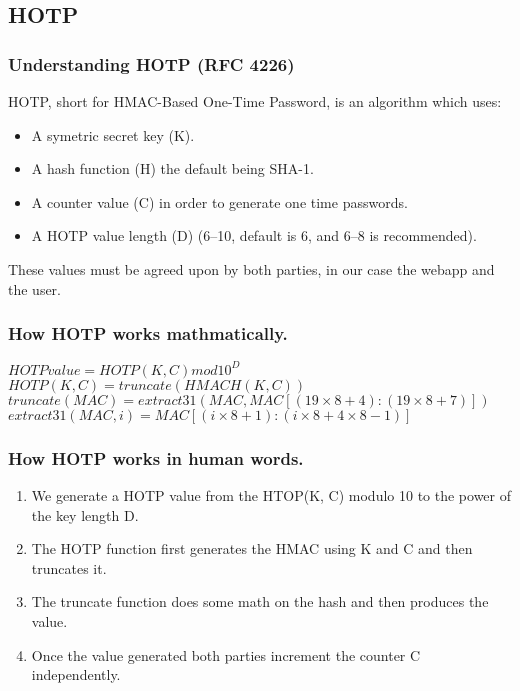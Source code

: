 \documentclass{beamer}
\begin{document}
\subsection{HOTP}
\begin{frame}

    \frametitle{Understanding HOTP (RFC 4226)}
    HOTP, short for HMAC-Based One-Time Password, is an algorithm which uses:
    \begin{itemize}
        \item 
            A symetric secret key (K).
        \item 
            A hash function (H) the default being SHA-1.
        \item 
            A counter value (C) in order to generate one time passwords.
        \item 
            A HOTP value length (D) (6–10, default is 6, and 6–8 is recommended).
    \end{itemize}

    These values must be agreed upon by both parties, in our case the webapp and the user.

\end{frame}

\begin{frame}
    \frametitle{How HOTP works mathmatically.}
    $HOTP  value = HOTP(K, C) mod 10^D$ \\
    $HOTP(K, C) = truncate(HMACH(K, C))$ \\
    $truncate(MAC) = extract31(MAC, MAC[(19 × 8 + 4):(19 × 8 + 7)])$ \\
    $extract31(MAC, i) = MAC[(i × 8 + 1):(i × 8 + 4 × 8 − 1)]$ \\

\end{frame}

\begin{frame}

    \frametitle{How HOTP works in human words.}
    \begin{enumerate}
        \item 
            We generate a HOTP value from the HTOP(K, C) modulo 10 to the power of the key length D.
        \item 
            The HOTP function first generates the HMAC using K and C and then truncates it.
        \item 
            The truncate function does some math on the hash and then produces the value. 
        \item 
            Once the value generated both parties increment the counter C independently.
    \end{enumerate}
\end{frame}
\end{document}
